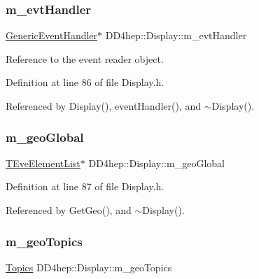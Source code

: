 \subsubsection{\texorpdfstring{m\+\_\+evt\+Handler}{m\_evtHandler}}
{\footnotesize\ttfamily \hyperlink{class_d_d4hep_1_1_generic_event_handler}{Generic\+Event\+Handler}$\ast$ D\+D4hep\+::\+Display\+::m\+\_\+evt\+Handler\hspace{0.3cm}{\ttfamily [protected]}}



Reference to the event reader object. 



Definition at line 86 of file Display.\+h.



Referenced by Display(), event\+Handler(), and $\sim$\+Display().

\hypertarget{class_d_d4hep_1_1_display_ad140be1ce0ad3e94e165623d66e16dca}{}\label{class_d_d4hep_1_1_display_ad140be1ce0ad3e94e165623d66e16dca} 
\subsubsection{\texorpdfstring{m\+\_\+geo\+Global}{m\_geoGlobal}}
{\footnotesize\ttfamily \hyperlink{class_t_eve_element_list}{T\+Eve\+Element\+List}$\ast$ D\+D4hep\+::\+Display\+::m\+\_\+geo\+Global\hspace{0.3cm}{\ttfamily [protected]}}



Definition at line 87 of file Display.\+h.



Referenced by Get\+Geo(), and $\sim$\+Display().

\hypertarget{class_d_d4hep_1_1_display_ade13a0eaa5fa83f5cf64f14ed7d3ef0d}{}\label{class_d_d4hep_1_1_display_ade13a0eaa5fa83f5cf64f14ed7d3ef0d} 
\subsubsection{\texorpdfstring{m\+\_\+geo\+Topics}{m\_geoTopics}}
{\footnotesize\ttfamily \hyperlink{class_d_d4hep_1_1_display_ab7cf442eb2211f57f55b7cd1cf8a61c1}{Topics} D\+D4hep\+::\+Display\+::m\+\_\+geo\+Topics\hspace{0.3cm}{\ttfamily [protected]}}



